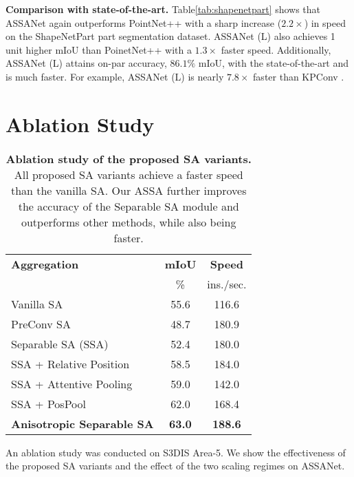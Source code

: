 \documentclass{article}
\newcommand{\tblLabel}{Table\xspace}
\newcommand{\mysection}[1]{\vspace{3pt}\noindent\textbf{#1.}}
\begin{document}
\mysection{Comparison with state-of-the-art}
\tblLabel \ref{tab:shapenetpart} shows that ASSANet again outperforms PointNet++ with a sharp increase ($2.2\times$) in speed on the ShapeNetPart part segmentation dataset. ASSANet (L) also achieves 1 unit higher mIoU than PoinetNet++ with a $1.3\times$ faster speed. Additionally, ASSANet (L) attains on-par accuracy, $86.1\%$ mIoU, with the state-of-the-art and is much faster. For example, ASSANet (L) is nearly $7.8\times$ faster than KPConv \cite{Thomas2019KPConvFA}. 
 \section{Ablation Study}
\begin{wraptable}{r}{7.5cm}
\vspace{-15mm}
\begin{center}
\begin{tabular}{lcc}
\midrule
\textbf{Aggregation} & \textbf{mIoU} & \textbf{Speed} \\
& \% & ins./sec.\\
\midrule
Vanilla SA & 55.6 &  116.6\\
PreConv SA & 48.7 &  180.9\\
Separable SA (SSA) & 52.4 & 180.0 \\ 
SSA + Relative Position & 58.5 & 184.0 \\ 
SSA + Attentive Pooling\cite{Hu2020RandLANetES} & 59.0 & 142.0 \\ 
SSA + PosPool\cite{Liu2020ACL} &62.0 & 168.4 \\ 
\textbf{Anisotropic Separable SA
} & \textbf{63.0} & \textbf{188.6} \\ 
\bottomrule
\end{tabular}
\end{center}
\caption{\textbf{Ablation study of the proposed SA variants.} All proposed SA variants achieve a faster speed than the vanilla SA. Our ASSA further improves the accuracy of the Separable SA module and outperforms other methods, while also being faster.  
}
\label{tab:abalation_sa}
\vspace{-10mm}
\end{wraptable}

An ablation study was conducted on S3DIS \cite{s3dis} Area-5. We show the effectiveness of the proposed SA variants and the effect of the two scaling regimes on ASSANet. 
\end{document}
